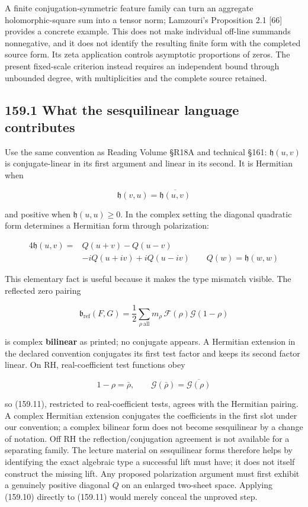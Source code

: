 \documentclass[
  11pt,
]{book}
\begin{document}
A finite conjugation-symmetric feature family can turn an aggregate
holomorphic-square sum into a tensor norm; Lamzouri's Proposition 2.1
{[}66{]} provides a concrete example. This does not make individual
off-line summands nonnegative, and it does not identify the resulting
finite form with the completed source form. Its zeta application
controls asymptotic proportions of zeros. The present fixed-scale
criterion instead requires an independent bound through unbounded
degree, with multiplicities and the complete source retained.

\subsection{159.1 What the sesquilinear language
contributes}\label{what-the-sesquilinear-language-contributes}

Use the same convention as Reading Volume §R18A and technical §161:
\(\mathfrak h(u,v)\) is conjugate-linear in its first argument and
linear in its second. It is Hermitian when

\[
\mathfrak h(v,u)=\overline{\mathfrak h(u,v)}
\tag{159.9}
\]

and positive when \(\mathfrak h(u,u)\ge0\). In the complex setting the
diagonal quadratic form determines a Hermitian form through
polarization:

\[
\boxed{
\begin{aligned}
4\mathfrak h(u,v)
={}&Q(u+v)-Q(u-v)\\
&-iQ(u+iv)+iQ(u-iv)
\qquad Q(w)=\mathfrak h(w,w)
\end{aligned}}
\tag{159.10}
\]

This elementary fact is useful because it makes the type mismatch
visible. The reflected zero pairing

\[
\mathfrak b_{\mathrm{ref}}(F,G)
=\frac12\sum_{\rho\ \mathrm{all}}m_\rho\,
\mathcal F(\rho)\mathcal G(1-\rho)
\tag{159.11}
\]

is complex \textbf{bilinear} as printed; no conjugate appears. A
Hermitian extension in the declared convention conjugates its first test
factor and keeps its second factor linear. On RH, real-coefficient test
functions obey

\[
1-\rho=\bar\rho,\qquad
\mathcal G(\bar\rho)=\overline{\mathcal G(\rho)}
\tag{159.12}
\]

so (159.11), restricted to real-coefficient tests, agrees with the
Hermitian pairing. A complex Hermitian extension conjugates the
coefficients in the first slot under our convention; a complex bilinear
form does not become sesquilinear by a change of notation. Off RH the
reflection/conjugation agreement is not available for a separating
family. The lecture material on sesquilinear forms therefore helps by
identifying the exact algebraic type a successful lift must have; it
does not itself construct the missing lift. Any proposed polarization
argument must first exhibit a genuinely positive diagonal \(Q\) on an
enlarged two-sheet space. Applying (159.10) directly to (159.11) would
merely conceal the unproved step.
\end{document}
